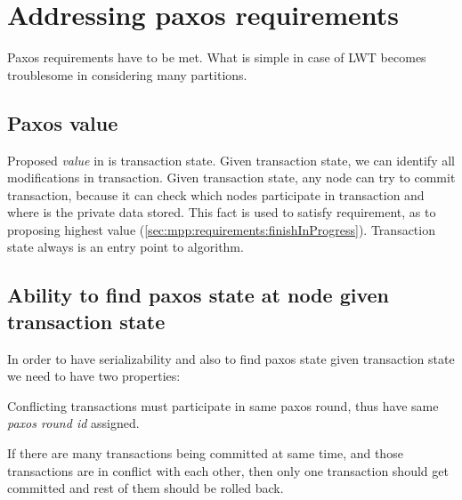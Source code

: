 
\section{Addressing paxos requirements}
Paxos requirements have to be met.
 What is simple in case of LWT becomes troublesome in \mpp considering many partitions. 


\subsection{Paxos value}
Proposed \emph{value} in \mpp is transaction state. Given transaction state, we can identify all modifications in transaction. Given transaction state, any node can try to commit transaction, because it can check which nodes participate in transaction and where is the private data stored. This fact is used to satisfy requirement, as to proposing highest value (\ref{sec:mpp:requirements:finishInProgress}).
Transaction state always is an entry point to algorithm.


\subsection{Ability to find paxos state at node given transaction state}
In order to have serializability and also to find paxos state given transaction state we need to have two properties:

\begin{definition}
  \label{def:samePaxosStateProperty}
  Conflicting transactions must participate in same paxos round, thus have same \emph{paxos round id} assigned.  
\end{definition}

\begin{definition}
  \label{def:txSerializability}
  If there are many transactions being committed at same time, and those transactions are in conflict with each other, then only one transaction should get committed and rest of them should be rolled back.   
\end{definition}

